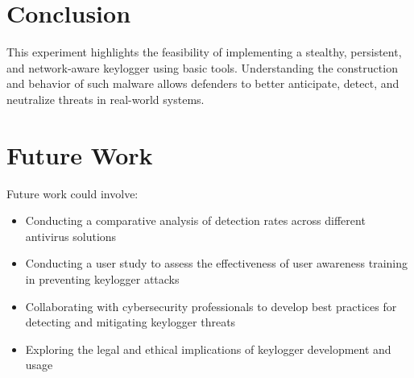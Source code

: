 \section{Conclusion}
This experiment highlights the feasibility of implementing a stealthy, persistent, and network-aware keylogger using basic tools. Understanding the construction and behavior of such malware allows defenders to better anticipate, detect, and neutralize threats in real-world systems.

\section{Future Work}
Future work could involve:
\begin{itemize} 
    \item Conducting a comparative analysis of detection rates across different antivirus solutions
    \item Conducting a user study to assess the effectiveness of user awareness training in preventing keylogger attacks
    \item Collaborating with cybersecurity professionals to develop best practices for detecting and mitigating keylogger threats
    \item Exploring the legal and ethical implications of keylogger development and usage
\end{itemize}